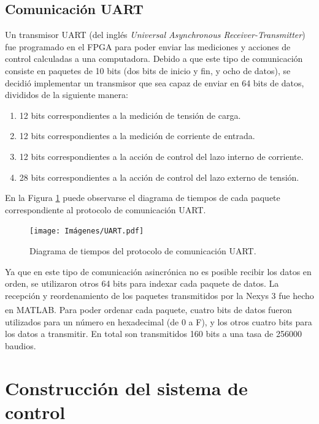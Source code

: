 \subsection{Comunicación UART}

Un transmisor UART (del inglés \emph{Universal Asynchronous Receiver-Transmitter}) fue programado en el FPGA para poder enviar las mediciones y acciones de control calculadas a una computadora. Debido a que este tipo de comunicación consiste en paquetes de 10 bits (dos bits de inicio y fin, y ocho de datos), se decidió implementar un transmisor que sea capaz de enviar en 64 bits de datos, divididos de la siguiente manera:

\begin{enumerate}
    \item 12 bits correspondientes a la medición de tensión de carga.
    \item 12 bits correspondientes a la medición de corriente de entrada.
    \item 12 bits correspondientes a la acción de control del lazo interno de corriente.
    \item 28 bits correspondientes a la acción de control del lazo externo de tensión.
\end{enumerate}

En la Figura \ref{uart} puede observarse el diagrama de tiempos de cada paquete correspondiente al protocolo de comunicación UART.

\begin{figure}[hbt!]
    \centering
    \texttt{[image: Imágenes/UART.pdf]}
    \caption{Diagrama de tiempos del protocolo de comunicación UART.}
    \label{uart}
\end{figure} 

Ya que en este tipo de comunicación asincrónica no es posible recibir los datos en orden, se utilizaron otros 64 bits para indexar cada paquete de datos. La recepción y reordenamiento de los paquetes transmitidos por la Nexys 3 fue hecho en MATLAB\textsuperscript\textregistered. Para poder ordenar cada paquete, cuatro bits de datos fueron utilizados para un número en hexadecimal (de 0 a F), y los otros cuatro bits para los datos a transmitir. En total son transmitidos 160 bits a una tasa de 256000 baudios.

\section{Construcción del sistema de control}

